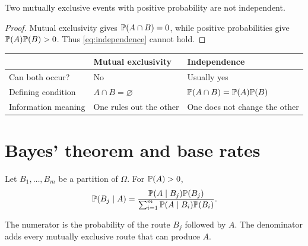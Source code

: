 \begin{proposition}
Two mutually exclusive events with positive probability are not independent.
\end{proposition}

\begin{proof}
Mutual exclusivity gives \(\mathbb{P}(A\cap B)=0\), while positive probabilities
give \(\mathbb{P}(A)\mathbb{P}(B)>0\). Thus \eqref{eq:independence} cannot hold.
\end{proof}

\begin{center}
\begin{tabular}{@{}L{0.28\textwidth}L{0.30\textwidth}L{0.30\textwidth}@{}}
\toprule
 & \textbf{Mutual exclusivity} & \textbf{Independence} \\
\midrule
Can both occur? & No & Usually yes \\
Defining condition & \(A\cap B=\varnothing\) &
\(\mathbb{P}(A\cap B)=\mathbb{P}(A)\mathbb{P}(B)\) \\
Information meaning & One rules out the other & One does not change the other \\
\bottomrule
\end{tabular}
\end{center}

\section{Bayes' theorem and base rates}

\begin{theorem}
Let \(B_1,\ldots,B_m\) be a partition of \(\Omega\). For \(\mathbb{P}(A)>0\),
\begin{equation}
  \mathbb{P}(B_j\mid A)
  =\frac{\mathbb{P}(A\mid B_j)\mathbb{P}(B_j)}
  {\sum_{i=1}^{m}\mathbb{P}(A\mid B_i)\mathbb{P}(B_i)}.
  \label{eq:bayes}
\end{equation}
\end{theorem}

The numerator is the probability of the route \(B_j\) followed by \(A\). The
denominator adds every mutually exclusive route that can produce \(A\).

